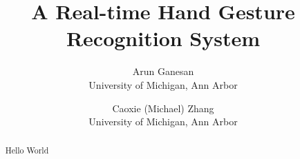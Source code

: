 \documentclass[letterpaper,twocolumn,10pt]{article}
\begin{document}
\date{}

\title{\Large \bf A Real-time Hand Gesture Recognition System}

\author{
{\rm Arun Ganesan}\\
University of Michigan, Ann Arbor
\and
{\rm Caoxie (Michael) Zhang}\\
University of Michigan, Ann Arbor
} %

\maketitle

\thispagestyle{empty}

\begin{abstract}
Hello World
\end{abstract}
























\end{document}
